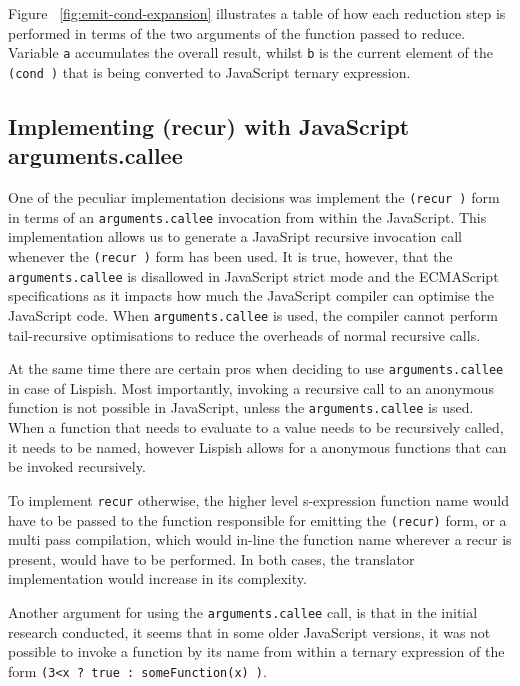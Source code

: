 

Figure ~\ref{fig:emit-cond-expansion} illustrates a table of how each reduction step is performed in terms of the two arguments of the function passed to reduce. Variable \texttt{a} accumulates the overall result, whilst \texttt{b} is the current element of the \texttt{(cond )} that is being converted to JavaScript ternary expression.

\subsection{Implementing (recur) with JavaScript arguments.callee}
One of the peculiar implementation decisions was implement the \texttt{(recur )} form in terms of an \texttt{arguments.callee} invocation from within the JavaScript. 
This implementation allows us to generate a JavaSript recursive invocation call whenever the \texttt{(recur )} form has been used. 
It is true, however, that the \texttt{arguments.callee} is disallowed in JavaScript strict mode and the ECMAScript specifications as it impacts how much the JavaScript compiler can optimise the JavaScript code. When \texttt{arguments.callee} is used, the compiler cannot perform tail-recursive optimisations to reduce the overheads of normal recursive calls.  


At the same time there are certain pros when deciding to use \texttt{arguments.callee} in case of Lispish. 
Most importantly, invoking a recursive call to an anonymous function is not possible in JavaScript, unless the \texttt{arguments.callee} is used. When a function that needs to evaluate to a value needs to be recursively called, it needs to be named, however Lispish allows for a anonymous functions that can be invoked recursively.

To implement \texttt{recur} otherwise, the higher level s-expression function name would have to be passed to the function responsible for emitting the \texttt{(recur)} form, or a multi pass compilation, which would in-line the function name wherever a recur is present, would have to be performed. In both cases, the translator implementation would increase in its complexity.

Another argument for using the \texttt{arguments.callee} call, is that in the initial research conducted, it seems that in some older JavaScript versions, it was not possible to invoke a function by its name from within a ternary expression of the form \texttt{(3<x ? true : someFunction(x) )}. 

